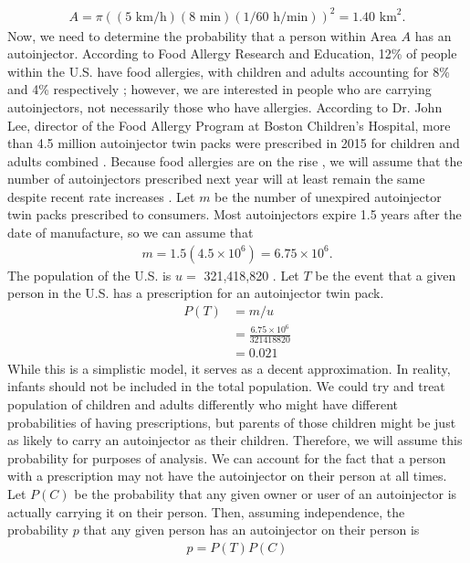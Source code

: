 \begin{align*}
    A = \pi\left(\left(5\text{ km/h}\right)\left(8\text{ min}\right)\left(1/60 \text{ h/min}\right)\right)^2 = 1.40 \text{ km}^2.
\end{align*}
Now, we need to determine the probability that a person within Area $A$ has an autoinjector. According to Food Allergy Research and Education, 12\% of people within the U.S. have food allergies, with children and adults accounting for 8\% and 4\% respectively \cite{food}; however, we are interested in people who are carrying autoinjectors, not necessarily those who have allergies. According to Dr. John Lee, director of the Food Allergy Program at Boston Children's Hospital, more than 4.5 million autoinjector twin packs were prescribed in 2015 for children and adults combined \cite{johnlee}. Because food allergies are on the rise \cite{food}, we will assume that the number of autoinjectors prescribed next year will at least remain the same despite recent rate increases \cite{wsjepi}. Let $m$ be the number of unexpired autoinjector twin packs prescribed to consumers. Most autoinjectors expire 1.5 years after the date of manufacture, so we can assume that
\begin{align*}
    m = 1.5(4.5 \times 10^6) = 6.75 \times 10^6.
\end{align*}
The population of the U.S. is $u=$ 321,418,820 \cite{acs}. Let $T$ be the event that a given person in the U.S. has a prescription for an autoinjector twin pack.
\begin{align*}
    P(T) &= m/u \\
    &= \frac{6.75 \times 10^6}{321418820}\\
    &= 0.021
\end{align*}
While this is a simplistic model, it serves as a decent approximation. In reality, infants should not be included in the total population. We could try and treat population of children and adults differently who might have different probabilities of having prescriptions, but parents of those children might be just as likely to carry an autoinjector as their children. Therefore, we will assume this probability for purposes of analysis. We can account for the fact that a person with a prescription may not have the autoinjector on their person at all times. Let $P(C)$ be the probability that any given owner or user of an autoinjector is actually carrying it on their person. Then, assuming independence, the probability $p$ that any given person has an autoinjector on their person is 
\begin{align*}
    p = P(T)P(C)
\end{align*}
